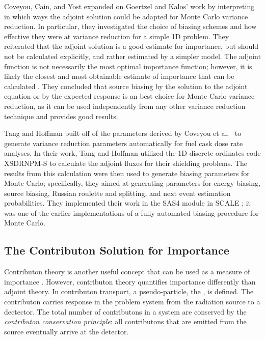 Coveyou, Cain, and Yost \cite{coveyou_adjoint_1967} expanded on Goertzel and
Kalos' work by interpreting in which ways the adjoint solution could be adapted
for Monte Carlo variance reduction. In particular, they investigated the choice
of biasing schemes and how effective they were at variance reduction for a
simple 1D problem. They reiterated that the adjoint solution is a
good estimate for importance, but should not be calculated explicitly, and
rather estimated by a simpler model. The adjoint function is not necessarily the
most optimal importance function; however, it is likely the closest and most
obtainable estimate of importance that can be calculated
\cite{coveyou_adjoint_1967}. They
concluded that source biasing by the solution to the adjoint equation or by the
expected response is an best choice for Monte Carlo variance reduction, as it
can be used independently from any other variance reduction technique and
provides good results.

Tang and Hoffman \cite{tang_monte_1988} built off of the parameters derived by
Coveyou et al.\ \cite{coveyou_adjoint_1967} to generate variance reduction
parameters automatically for fuel cask dose rate analyses. In their work, Tang
and Hoffman utilized the 1D discrete ordinates code XSDRNPM-S to
calculate the adjoint fluxes for their shielding problems. The results from this
calculation were then used to generate biasing parameters for Monte Carlo;
specifically, they aimed at generating parameters for energy biasing, source
biasing, Russian roulette and splitting, and next event estimation
probabilities. They implemented their work in the SAS4 module in SCALE
\cite{SCALE6_1}; it was
one of the earlier implementations of a fully automated biasing procedure for
Monte Carlo.

\subsection{The Contributon Solution for Importance}
\label{sec:ContributonImportance}

Contributon theory is another useful concept that can be used as a measure of
importance
\cite{williams_generalized_1991,williams_contributorn_1992,williams_contributon_study}.
However, contributon theory quantifies importance differently than
adjoint theory. In contributon transport, a pseudo-particle, the
, is defined. The contributon carries response in the problem
system from the radiation source to a dectector. The
total number of contributons in a system are conserved by the \textit{contributon
conservation principle}: all contributons that are emitted from the source
eventually arrive at the detector. 

